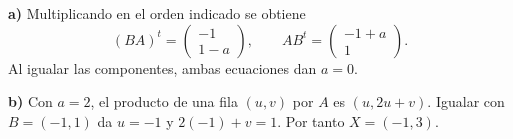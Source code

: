 \textbf{a)} Multiplicando en el orden indicado se obtiene
\[
(BA)^t=\begin{pmatrix}-1\\1-a\end{pmatrix},\qquad
AB^t=\begin{pmatrix}-1+a\\1\end{pmatrix}.
\]
Al igualar las componentes, ambas ecuaciones dan $\boxed{a=0}$.

\textbf{b)} Con $a=2$, el producto de una fila $(u,v)$ por
$A$ es $(u,2u+v)$. Igualar con $B=(-1,1)$ da $u=-1$
y $2(-1)+v=1$. Por tanto $\boxed{X=(-1,3)}$.
